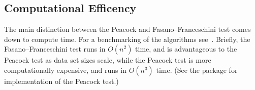 \documentclass[codesnippet]{jss}
\begin{document}
\subsection{Computational Efficency}
The main distinction between the Peacock and Fasano--Franceschini test comes down to compute time. For a benchmarking of the algorithms see~\citep{Lopes2007}.  Briefly,
the Fasano--Franceschini test runs in $O(n^2)$ time, and is advantageous to the Peacock test as data set sizes scale, while the Peacock test is more computationally expensive, and runs in $O(n^3)$ time.
%
(See the  package for  implementation of the Peacock test.)
\end{document}
